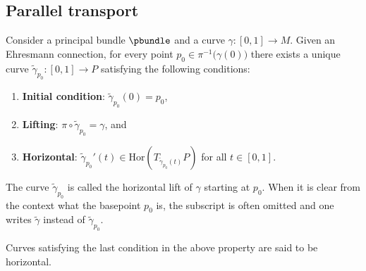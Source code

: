 \subsection{Parallel transport}

    \begin{definition}
        Consider a principal bundle $\pbundle$ and a curve $\gamma:[0,1]\rightarrow M$. Given an Ehresmann connection, for every point $p_0\in\pi^{-1}\big(\gamma(0)\big)$ there exists a unique curve $\widetilde{\gamma}_{p_0}:[0,1]\rightarrow P$ satisfying the following conditions:
        \begin{enumerate}
            \item\textbf{Initial condition}: $\widetilde{\gamma}_{p_0}(0) = p_0$,
            \item\textbf{Lifting}: $\pi\circ\widetilde{\gamma}_{p_0} = \gamma$, and
            \item\textbf{Horizontal}: $\widetilde{\gamma}_{p_0}'(t)\in\mathrm{Hor}\left(T_{\widetilde{\gamma}_{p_0}(t)}P\right)$ for all $t\in[0,1]$.
        \end{enumerate}
        The curve $\widetilde{\gamma}_{p_0}$ is called the horizontal lift of $\gamma$ starting at $p_0$. When it is clear from the context what the basepoint $p_0$ is, the subscript is often omitted and one writes $\widetilde{\gamma}$ instead of $\widetilde{\gamma}_{p_0}$.
    \end{definition}
    \begin{remark}
        Curves satisfying the last condition in the above property are said to be horizontal.
    \end{remark}


